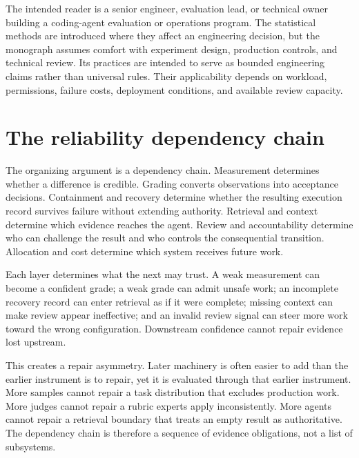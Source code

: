 The intended reader is a senior engineer, evaluation lead, or technical owner building a coding-agent evaluation or operations program. The statistical methods are introduced where they affect an engineering decision, but the monograph assumes comfort with experiment design, production controls, and technical review. Its practices are intended to serve as bounded engineering claims rather than universal rules. Their applicability depends on workload, permissions, failure costs, deployment conditions, and available review capacity.

\hypertarget{the-reliability-dependency-chain}{%
\section{The reliability dependency chain}\label{the-reliability-dependency-chain}}

The organizing argument is a dependency chain. Measurement determines whether a difference is credible. Grading converts observations into acceptance decisions. Containment and recovery determine whether the resulting execution record survives failure without extending authority. Retrieval and context determine which evidence reaches the agent. Review and accountability determine who can challenge the result and who controls the consequential transition. Allocation and cost determine which system receives future work.

Each layer determines what the next may trust. A weak measurement can become a confident grade; a weak grade can admit unsafe work; an incomplete recovery record can enter retrieval as if it were complete; missing context can make review appear ineffective; and an invalid review signal can steer more work toward the wrong configuration. Downstream confidence cannot repair evidence lost upstream.

This creates a repair asymmetry. Later machinery is often easier to add than the earlier instrument is to repair, yet it is evaluated through that earlier instrument. More samples cannot repair a task distribution that excludes production work. More judges cannot repair a rubric experts apply inconsistently. More agents cannot repair a retrieval boundary that treats an empty result as authoritative. The dependency chain is therefore a sequence of evidence obligations, not a list of subsystems.

